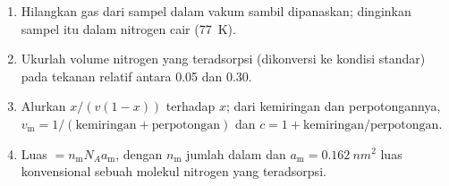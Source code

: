 \begin{method}\label{met:b3:surfaces-catalysis:bet-area}
\begin{enumerate}
  \item Hilangkan gas dari sampel dalam vakum sambil dipanaskan; dinginkan sampel
        itu dalam nitrogen cair (\qty{77}{K}).
  \item Ukurlah volume nitrogen yang teradsorpsi (dikonversi ke kondisi standar)
        pada tekanan relatif antara 0.05 dan 0.30.
  \item Alurkan $x/(v(1 - x))$ terhadap $x$; dari kemiringan dan perpotongannya,
        $v_{\mathrm m} = 1/(\text{kemiringan} + \text{perpotongan})$ dan $c = 1 + \text{kemiringan}/\text{perpotongan}$.
  \item Luas $= n_{\mathrm m}N_Aa_{\mathrm m}$, dengan $n_{\mathrm m}$ jumlah dalam  dan $a_{\mathrm m} = \qty{0.162}{nm^2}$
        luas konvensional sebuah molekul nitrogen yang teradsorpsi.
\end{enumerate}
\end{method}

